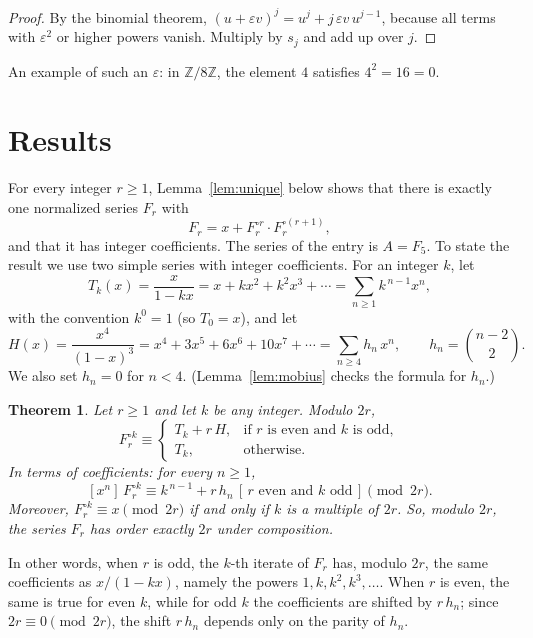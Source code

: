 \documentclass[11pt,a4paper]{article}
\newtheorem{theorem}{Theorem}[section]
\theoremstyle{definition}
\theoremstyle{remark}
\newcommand{\Z}{\mathbb{Z}}
\newcommand{\coeff}[2]{[x^{#1}]\,#2}
\begin{document}
\begin{proof}
By the binomial theorem, $(u+\varepsilon v)^j=u^j+j\,\varepsilon v\,u^{j-1}$, because all terms with
$\varepsilon^2$ or higher powers vanish. Multiply by $s_j$ and add up over $j$.
\end{proof}
An example of such an $\varepsilon$: in $\Z/8\Z$, the element $4$ satisfies $4^2=16=0$.

\section{Results}\label{sec:results}

For every integer $r\ge1$, Lemma~\ref{lem:unique} below shows that there is exactly one normalized series $F_r$ with
\begin{equation}\label{eq:family}
F_r=x+F_r^{\circ r}\cdot F_r^{\circ(r+1)},
\end{equation}
and that it has integer coefficients. The series of the entry is $A=F_{5}$. To state the result we use
two simple series with integer coefficients. For an integer $k$, let
\[
T_k(x)=\frac{x}{1-kx}=x+kx^2+k^2x^3+\cdots=\sum_{n\ge1}k^{\,n-1}x^n ,
\]
with the convention $k^0=1$ (so $T_0=x$), and let
\[
H(x)=\frac{x^4}{(1-x)^3}=x^4+3x^5+6x^6+10x^7+\cdots=\sum_{n\ge4}h_n\,x^n,\qquad h_n=\binom{n-2}{2}.
\]
We also set $h_n=0$ for $n<4$. (Lemma~\ref{lem:mobius} checks the formula for $h_n$.)

\begin{theorem}\label{thm:general}
Let $r\ge1$ and let $k$ be any integer. Modulo $2r$,
\[
F_r^{\circ k}\equiv
\begin{cases}
T_k+r\,H, & \text{if $r$ is even and $k$ is odd},\\
T_k, & \text{otherwise}.
\end{cases}
\]
In terms of coefficients: for every $n\ge1$,
\[
\coeff{n}{F_r^{\circ k}}\equiv k^{\,n-1}+r\,h_n\,[\,r\text{ even and }k\text{ odd}\,]\pmod{2r}.
\]
Moreover, $F_r^{\circ k}\equiv x\pmod{2r}$ if and only if $k$ is a multiple of $2r$. So, modulo $2r$, the series $F_r$
has order exactly $2r$ under composition.
\end{theorem}

In other words, when $r$ is odd, the $k$-th iterate of $F_r$ has, modulo $2r$, the same coefficients as $x/(1-kx)$,
namely the powers $1,k,k^2,k^3,\dots$. When $r$ is even, the same is true for even $k$, while for odd $k$ the
coefficients are shifted by $r\,h_n$; since $2r\equiv0\pmod{2r}$, the shift $r\,h_n$ depends only on the parity of
$h_n$.
\end{document}
